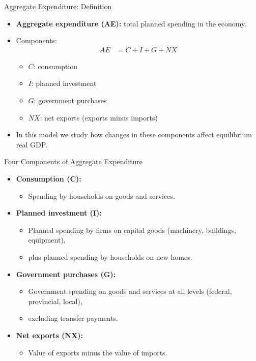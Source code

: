 \documentclass[aspectratio=169]{beamer}
\begin{document}
\begin{frame}{Aggregate Expenditure: Definition}
\transfade
\begin{itemize}
  \item \textbf{Aggregate expenditure (AE):} total planned spending in the economy.
  \item Components:
  \begin{align*}
    AE &= C + I + G + NX
  \end{align*}
  \begin{itemize}
    \item \(C\): consumption
    \item \(I\): planned investment
    \item \(G\): government purchases
    \item \(NX\): net exports (exports minus imports)
  \end{itemize}
  \item In this model we study how changes in these components affect equilibrium real GDP.
\end{itemize}
\end{frame}

\begin{frame}{Four Components of Aggregate Expenditure}
\transfade
\begin{itemize}
  \item \textbf{Consumption (C):}
  \begin{itemize}
    \item Spending by households on goods and services.
  \end{itemize}
  \item \textbf{Planned investment (I):}
  \begin{itemize}
    \item Planned spending by firms on capital goods (machinery, buildings, equipment),
    \item plus planned spending by households on new homes.
  \end{itemize}
  \item \textbf{Government purchases (G):}
  \begin{itemize}
    \item Government spending on goods and services at all levels (federal, provincial, local),
    \item excluding transfer payments.
  \end{itemize}
  \item \textbf{Net exports (NX):}
  \begin{itemize}
    \item Value of exports minus the value of imports.
  \end{itemize}
\end{itemize}
\end{frame}
\end{document}

